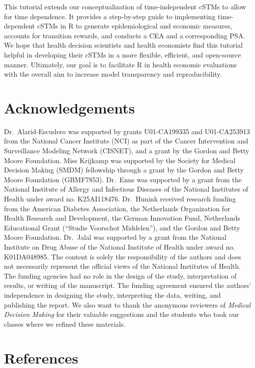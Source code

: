 \documentclass[
]{article}
\begin{document}
This tutorial extends our conceptualization of time-independent cSTMs to allow for time dependence. It provides a step-by-step guide to implementing time-dependent cSTMs in R to generate epidemiological and economic measures, accounts for transition rewards, and conducts a CEA and a corresponding PSA. We hope that health decision scientists and health economists find this tutorial helpful in developing their cSTMs in a more flexible, efficient, and open-source manner. Ultimately, our goal is to facilitate R in health economic evaluations with the overall aim to increase model transparency and reproducibility.

\hypertarget{acknowledgements}{%
\section{Acknowledgements}\label{acknowledgements}}

Dr.~Alarid-Escudero was supported by grants U01-CA199335 and U01-CA253913 from the National Cancer Institute (NCI) as part of the Cancer Intervention and Surveillance Modeling Network (CISNET), and a grant by the Gordon and Betty Moore Foundation. Miss Krijkamp was supported by the Society for Medical Decision Making (SMDM) fellowship through a grant by the Gordon and Betty Moore Foundation (GBMF7853). Dr.~Enns was supported by a grant from the National Institute of Allergy and Infectious Diseases of the National Institutes of Health under award no. K25AI118476. Dr.~Hunink received research funding from the American Diabetes Association, the Netherlands Organization for Health Research and Development, the German Innovation Fund, Netherlands Educational Grant (``Studie Voorschot Middelen''), and the Gordon and Betty Moore Foundation. Dr.~Jalal was supported by a grant from the National Institute on Drug Abuse of the National Institute of Health under award no. K01DA048985. The content is solely the responsibility of the authors and does not necessarily represent the official views of the National Institutes of Health. The funding agencies had no role in the design of the study, interpretation of results, or writing of the manuscript. The funding agreement ensured the authors' independence in designing the study, interpreting the data, writing, and publishing the report. We also want to thank the anonymous reviewers of \emph{Medical Decision Making} for their valuable suggestions and the students who took our classes where we refined these materials.

\hypertarget{references}{%
\section*{References}\label{references}}
\end{document}

